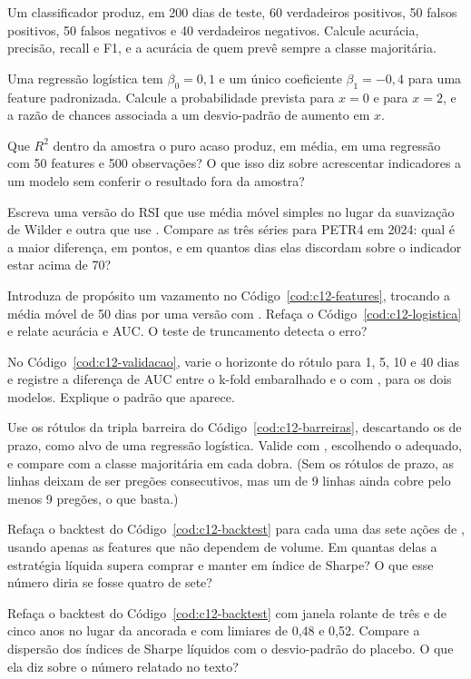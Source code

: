 \begin{exercicios}
  \item {} Um classificador produz, em 200 dias de teste, 60 verdadeiros positivos, 50 falsos positivos, 50 falsos negativos e 40 verdadeiros negativos. Calcule acurácia, precisão, recall e F1, e a acurácia de quem prevê sempre a classe majoritária.
  \item {} Uma regressão logística tem $\beta_0 = 0,1$ e um único coeficiente $\beta_1 = -0,4$ para uma feature padronizada. Calcule a probabilidade prevista para $x = 0$ e para $x = 2$, e a razão de chances associada a um desvio-padrão de aumento em $x$.
  \item {} Que $R^2$ dentro da amostra o puro acaso produz, em média, em uma regressão com 50 features e 500 observações? O que isso diz sobre acrescentar indicadores a um modelo sem conferir o resultado fora da amostra?
  \item {} Escreva uma versão do RSI que use média móvel simples no lugar da suavização de Wilder e outra que use . Compare as três séries para PETR4 em 2024: qual é a maior diferença, em pontos, e em quantos dias elas discordam sobre o indicador estar acima de 70?
  \item {} Introduza de propósito um vazamento no Código~\ref{cod:c12-features}, trocando a média móvel de 50 dias por uma versão com . Refaça o Código~\ref{cod:c12-logistica} e relate acurácia e AUC. O teste de truncamento detecta o erro?
  \item {} No Código~\ref{cod:c12-validacao}, varie o horizonte do rótulo para 1, 5, 10 e 40 dias e registre a diferença de AUC entre o k-fold embaralhado e o  com , para os dois modelos. Explique o padrão que aparece.
  \item {} Use os rótulos da tripla barreira do Código~\ref{cod:c12-barreiras}, descartando os de prazo, como alvo de uma regressão logística. Valide com , escolhendo o  adequado, e compare com a classe majoritária em cada dobra. (Sem os rótulos de prazo, as linhas deixam de ser pregões consecutivos, mas um  de 9 linhas ainda cobre pelo menos 9 pregões, o que basta.)
  \item {} Refaça o backtest do Código~\ref{cod:c12-backtest} para cada uma das sete ações de , usando apenas as features que não dependem de volume. Em quantas delas a estratégia líquida supera comprar e manter em índice de Sharpe? O que esse número diria se fosse quatro de sete?
  \item {} Refaça o backtest do Código~\ref{cod:c12-backtest} com janela rolante de três e de cinco anos no lugar da ancorada e com limiares de 0,48 e 0,52. Compare a dispersão dos índices de Sharpe líquidos com o desvio-padrão do placebo. O que ela diz sobre o número relatado no texto?
\end{exercicios}

